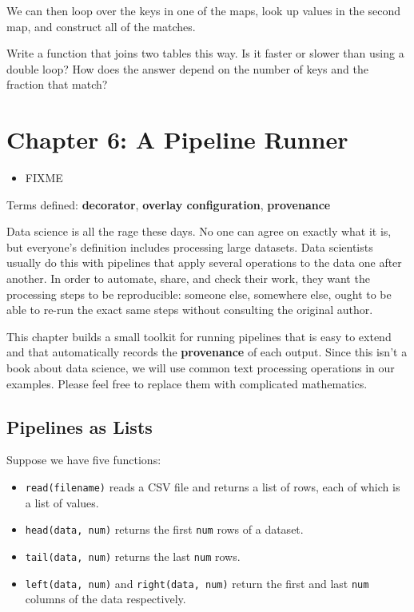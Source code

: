 \documentclass{scrbook}
\newcommand{\glossref}[1]{\textbf{#1}}
\begin{document}
\noindent We can then loop over the keys in one of the maps,
look up values in the second map,
and construct all of the matches.


Write a function that joins two tables this way.
Is it faster or slower than using a double loop?
How does the answer depend on the number of keys and the fraction that match?

\chapter{Chapter 6: A Pipeline Runner}\label{pipeline}

\begin{itemize}

\item FIXME

\end{itemize}


\noindent 
    Terms defined:
    \glossref{decorator}, \glossref{overlay configuration}, \glossref{provenance}



Data science is all the rage these days.
No one can agree on exactly what it is,
but everyone's definition includes processing large datasets.
Data scientists usually do this with pipelines
that apply several operations to the data one after another.
In order to automate, share, and check their work,
they want the processing steps to be reproducible:
someone else,
somewhere else,
ought to be able to re-run the exact same steps
without consulting the original author.


This chapter builds a small toolkit for running pipelines
that is easy to extend
and that automatically records the \glossref{provenance}
of each output.
Since this isn't a book about data science,
we will use common text processing operations in our examples.
Please feel free to replace them with complicated mathematics.

\section{Pipelines as Lists}\label{pipeline-list}


Suppose we have five functions:

\begin{itemize}

\item \texttt{read(filename)} reads a CSV file and returns a list of rows,
   each of which is a list of values.

\item \texttt{head(data, num)} returns the first \texttt{num} rows of a dataset.

\item \texttt{tail(data, num)} returns the last \texttt{num} rows.

\item \texttt{left(data, num)} and \texttt{right(data, num)} return
    the first and last \texttt{num} columns of the data respectively.

\end{itemize}
\end{document}
